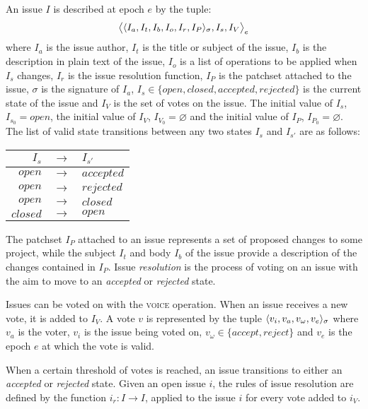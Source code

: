 
An issue $I$ is described at epoch $e$ by the tuple:
\[
    \big<\langle I_a, I_t, I_b, I_o, I_r, I_P \rangle_{\sigma}, I_s, I_V \big>_e
\]
where $I_a$ is the issue author, $I_t$ is the title or subject of the issue,
$I_b$ is the description in plain text of the issue, $I_o$ is a list of
operations to be applied when $I_s$ changes, $I_r$ is the issue resolution
function, $I_P$ is the patchset attached to the issue, $\sigma$ is the
signature of $I_a$, $I_s \in \{open, closed, accepted, rejected\}$ is the
current state of the issue and $I_V$ is the set of votes on the issue. The
initial value of $I_s$, $I_{s_0} = open$, the initial value of $I_V$, $I_{V_0}
= \varnothing$ and the initial value of $I_P$, $I_{P_0} = \varnothing$.  The list
of valid state transitions between any two states $I_s$ and $I_{s'}$ are as
follows:

\begin{fig}
    \centering
    \begin{tabular}{@{}rcl@{}}
        \toprule
        $I_s$      & $\to$ & $I_{s'}$ \\
        \midrule
        $open$     & $\to$ & $accepted$ \\
        $open$     & $\to$ & $rejected$ \\
        $open$     & $\to$ & $closed$ \\
        $closed$   & $\to$ & $open$ \\
        \bottomrule
    \end{tabular}
\end{fig}

The patchset $I_P$ attached to an issue represents a set of proposed changes to
some project, while the subject $I_t$ and body $I_b$ of the issue provide a
description of the changes contained in $I_P$. Issue \emph{resolution} is the
process of voting on an issue with the aim to move to an \emph{accepted} or
\emph{rejected} state.

Issues can be voted on with the \textsc{voice} operation. When an issue receives
a new vote, it is added to $I_V$. A vote $v$ is represented by the tuple
$\langle v_i, v_a, v_{\omega}, v_e \rangle_{\sigma}$ where $v_a$ is the voter,
$v_i$ is the issue being voted on, $v_{\omega} \in \{accept, reject\}$ and
$v_e$ is the epoch $e$ at which the vote is valid.

When a certain threshold of votes is reached, an issue transitions to either an
\emph{accepted} or \emph{rejected} state. Given an open issue $i$, the rules of
issue resolution are defined by the function $i_r : I \to I$, applied to the
issue $i$ for every vote added to $i_V$.


